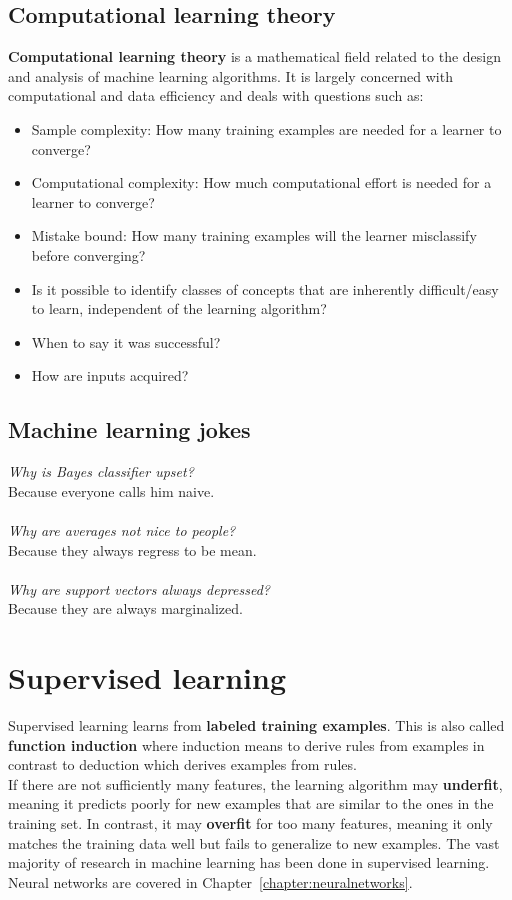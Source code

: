 \documentclass{report}
\begin{document}
\section{Computational learning theory}
{\bf Computational learning theory} is a mathematical field related to the design and analysis of machine learning algorithms.
It is largely concerned with computational and data efficiency and deals with questions such as:
\begin{itemize}
\item Sample complexity: How many training examples are needed for a learner to converge?
\item Computational complexity: How much computational effort is needed for a learner to converge?
\item Mistake bound: How many training examples will the learner misclassify before converging?
\item Is it possible to identify classes of concepts that are inherently difficult/easy to learn, independent of the learning algorithm?
\item When to say it was successful?
\item How are inputs acquired?
\end{itemize}

\section{Machine learning jokes}
{\em Why is Bayes classifier upset?} \\
Because everyone calls him naive.
\\
\\
{\em Why are averages not nice to people?} \\
Because they always regress to be mean.
\\
\\
{\em Why are support vectors always depressed?} \\
Because they are always marginalized.




\chapter{Supervised learning}
Supervised learning learns from {\bf labeled training examples}. 
This is also called {\bf function induction} where induction means to derive rules from examples in contrast to deduction which derives examples from rules.
\\
If there are not sufficiently many features, the learning algorithm may {\bf underfit}, meaning it predicts poorly for new examples that are similar to the ones in the training set.
In contrast, it may {\bf overfit} for too many features, meaning it only matches the training data well but fails to generalize to new examples.
The vast majority of research in machine learning has been done in supervised learning.
\\
Neural networks are covered in Chapter~\ref{chapter:neuralnetworks}.
\end{document}
